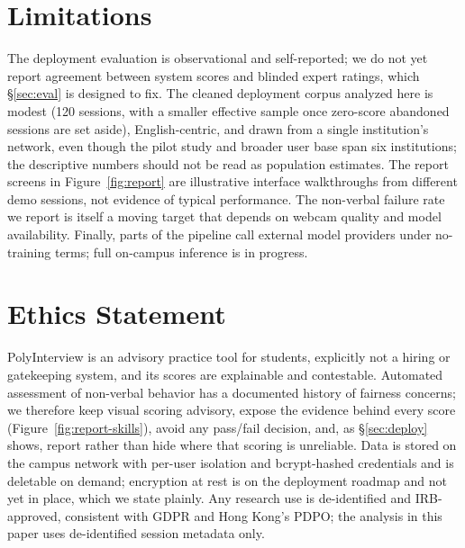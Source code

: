 \documentclass[11pt]{article}
\begin{document}
\section*{Limitations}
The deployment evaluation is observational and self-reported; we do not yet report agreement between system scores and blinded expert ratings, which \S\ref{sec:eval} is designed to fix. The cleaned deployment corpus analyzed here is modest (120 sessions, with a smaller effective sample once zero-score abandoned sessions are set aside), English-centric, and drawn from a single institution's network, even though the pilot study and broader user base span six institutions; the descriptive numbers should not be read as population estimates. The report screens in Figure~\ref{fig:report} are illustrative interface walkthroughs from different demo sessions, not evidence of typical performance. The non-verbal failure rate we report is itself a moving target that depends on webcam quality and model availability. Finally, parts of the pipeline call external model providers under no-training terms; full on-campus inference is in progress.

\section*{Ethics Statement}
PolyInterview is an advisory practice tool for students, explicitly not a hiring or gatekeeping system, and its scores are explainable and contestable. Automated assessment of non-verbal behavior has a documented history of fairness concerns; we therefore keep visual scoring advisory, expose the evidence behind every score (Figure~\ref{fig:report-skills}), avoid any pass/fail decision, and, as \S\ref{sec:deploy} shows, report rather than hide where that scoring is unreliable. Data is stored on the campus network with per-user isolation and bcrypt-hashed credentials and is deletable on demand; encryption at rest is on the deployment roadmap and not yet in place, which we state plainly. Any research use is de-identified and IRB-approved, consistent with GDPR and Hong Kong's PDPO; the analysis in this paper uses de-identified session metadata only.



\appendix
\end{document}
